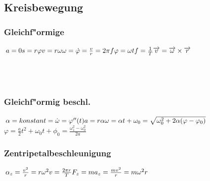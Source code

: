 \subsection{Kreisbewegung}

\begin{multicols}{3}
	\subsubsection{Gleichf"ormige}
	$a = 0 \\
	s = r\varphi \\
	v = r\omega \\
	\omega = \dot \varphi = \frac{v}{r} = 2\pi f\\
	\varphi = \omega t \\
	f = \frac{1}{T} \\
	\overrightarrow{v} = \overrightarrow{\omega} \times \overrightarrow{r}$ \\
	\\
	\\
	\\
	\columnbreak
\subsubsection{Gleichf"ormig beschl.}
	$\alpha = konstant = \dot \omega = \varphi''(t) \\
	a = r \alpha \\
	\omega = \alpha t + \omega_{0} = \sqrt{\omega_{0}^2 + 2 \alpha(\varphi - \varphi_{0})}$ \\
	$\varphi =\frac{a}{2}t^2 + \omega_{0}t + \phi_{0} = \frac{\omega_{1}^2 -\omega_{0}^2}{2a}$	\\
	\columnbreak
	\subsubsection{Zentripetalbeschleunigung}
	$\alpha_{z} = \frac{v^2}{r} = r\omega^2 \\
	v = \frac{2\pi r}{T} \\
	F_{z} = ma_{z} = \frac{mv^2}{r} = m\omega^2r$ \\
	\\
\end{multicols}


